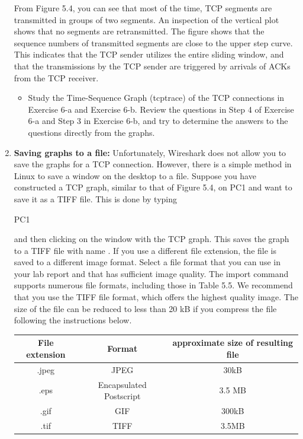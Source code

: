 \begin{enumerate}
		From Figure 5.4, you can see that most of the time, TCP segments are transmitted in groups of two segments. An inspection of the vertical plot shows that no segments are retransmitted. The figure shows that the sequence numbers of transmitted segments are close to the upper step curve. This indicates that the TCP sender utilizes the entire sliding window, and that the transmissions by the TCP sender are triggered by arrivals of ACKs from the TCP receiver.
		\begin{itemize}
			\item Study the Time-Sequence Graph (tcptrace) of the TCP connections in Exercise 6-a and Exercise 6-b. Review the questions in Step 4 of Exercise 6-a and Step 3 in Exercise 6-b, and try to determine the answers to the questions directly from the graphs.
		\end{itemize}
	\item \textbf{Saving graphs to a file:} Unfortunately, Wireshark does not allow you to save the graphs for a TCP connection. However, there is a simple method in Linux to save a window on the desktop to a file.
Suppose you have constructed a TCP graph, similar to that of Figure 5.4, on PC1 and want to save it as a TIFF file. This is done by typing
		\begin{cmdblock}
	PC1%
		\end{cmdblock}
		and then clicking on the window with the TCP graph. This saves the graph to a TIFF file with name . If you use a different file extension, the file is saved to a different image format. Select a file format that you can use in your lab report and that has sufficient image quality. The import command supports numerous file formats, including those in Table 5.5. We recommend that you use the TIFF file format, which offers the highest quality image. The size of the file can be reduced to less than 20 kB if you compress the file following the instructions below.
		\begin{table}[ht]
			\centering
			\begin{tabular}{ | c | c | c |}
				\hline
				\textbf{File extension} & \textbf{Format} & \textbf{approximate size of resulting file} \\ \hline
				.jpeg & JPEG & 30kB \\ \hline
				.eps & Encapsulated Postscript & 3.5 MB \\ \hline
				.gif & GIF & 300kB \\ \hline
				.tif & TIFF & 3.5MB \\ \hline

\end{tabular}
\end{table}
\end{enumerate}
